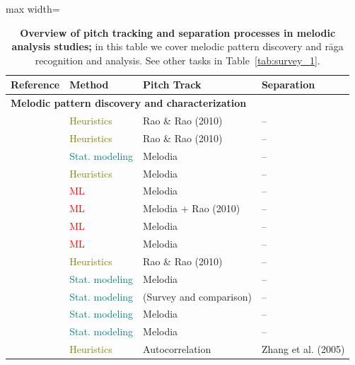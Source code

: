\begin{table}[p]
\centering
\footnotesize
\caption{\textbf{Overview of pitch tracking and separation processes in melodic analysis studies;} in this table we cover melodic pattern discovery and r\={a}ga recognition and analysis. See other tasks in Table~\ref{tab:survey_1}.}
\label{tab:survey_2}
\begin{adjustbox}{max width=\textwidth}
\begin{tabular}{l p{2.2cm} p{3.8cm} p{2.7cm}}
\toprule
\textbf{Reference} & \textbf{Method} & \textbf{Pitch Track} & \textbf{Separation} \\
\midrule
\multicolumn{4}{l}{\textbf{Melodic pattern discovery and characterization}} \\
\midrule
\citep{ross-detection} & \textcolor{olive}{Heuristics} & Rao \& Rao (2010) & -- \\
\citep{ross-motifs} & \textcolor{olive}{Heuristics} & Rao \& Rao (2010) & -- \\
\citep{ishwar-motif_alapana} & \textcolor{teal}{Stat. modeling} & Melodia & -- \\
\citep{dutta-motifs} & \textcolor{olive}{Heuristics} & Melodia & -- \\
\citep{gulati-mining} & \textcolor{red}{ML} & Melodia & -- \\
\citep{rao-motifs} & \textcolor{red}{ML} & Melodia + Rao (2010) & -- \\
\citep{ganguli-structures} & \textcolor{red}{ML} & Melodia & -- \\
\citep{gulati-motifs_communities} & \textcolor{red}{ML} & Melodia & -- \\
\citep{ganguli-melodic_shape} & \textcolor{olive}{Heuristics} & Rao \& Rao (2010) & -- \\
\citep{viraraghavan-statistical} & \textcolor{teal}{Stat. modeling} & Melodia & -- \\
\citep{velankar-pattern_pitch} & \textcolor{teal}{Stat. modeling} & (Survey and comparison) & -- \\
\citep{viraraghavan-precision} & \textcolor{teal}{Stat. modeling} & Melodia & -- \\
\citep{viraraghavan-state_based} & \textcolor{teal}{Stat. modeling} & Melodia & -- \\
\citep{velankar-pattern} & \textcolor{olive}{Heuristics} & Autocorrelation & Zhang et al. (2005) \\

\end{tabular}
\end{adjustbox}
\end{table}
